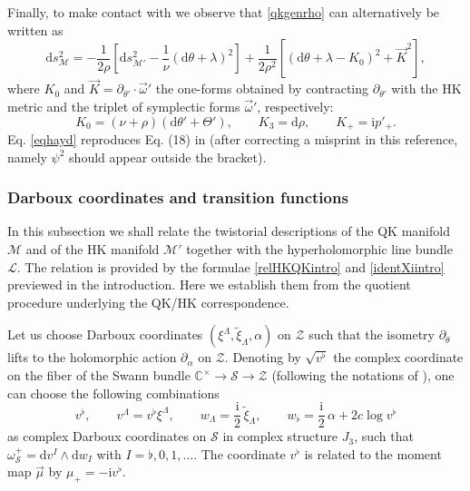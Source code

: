 \documentclass[12pt,reqno]{article}
\numberwithin{equation}{section}
\newcommand{\be}{\begin{equation}}
\newcommand{\ee}{\end{equation}}
\def\({\left(}
\def\){\right)}
\def\vf{v^{\flat}}
\newcommand{\de}{\mathrm{d}}
\newcommand{\I}{\mathrm{i}}
\newcommand{\cS}{\mathcal{S}}
\newcommand{\cM}{\mathcal{M}}
\newcommand{\cZ}{\mathcal{Z}}
\newcommand{\IC}{\mathbb{C}}
\newcommand{\lb}{\mathscr{L}}
\def\pa{\partial}
\newcommand{\txi}{\tilde\xi}
\def\sigp{{\theta}}
\def\phip{{\theta'}}
\def\hcon{p'_+}
\def\pTheta{\Theta'}
\def\pcM{\cM'}
\def\pomega{\omega'}
\def\cfff{\nu} %
\def\conhyper{\lambda}
\numberwithin{equation}{section}
\begin{document}
Finally, to make contact with  \cite{1143.53043}
we observe that \eqref{qkgenrho} can alternatively be written as
\be
\label{eqhayd}
\de s^2_{\cM} =-\frac{1}{2\rho}\left[ \de s^2_{\pcM} - \frac1{\cfff}
\left(\de\sigp+ \conhyper \right)^2 \right]
+\frac{1}{2\rho^2}\left[ \left( \de\sigp+\conhyper -K_0\right)^2
+ \vec K^2 \right],
\ee
where $K_0$ and $\vec K=\pa_{\phip}\cdot \vec\pomega$ the one-forms
obtained by contracting  $\pa_{\phip}$ with the HK metric and the triplet
of symplectic forms $\vec\pomega$, respectively:
\be
K_0=(\cfff+\rho)  \( \de\phip+\pTheta\) ,
\qquad
K_3=\de\rho,
\qquad
K_+=\I \hcon .
\ee
Eq. \eqref{eqhayd} reproduces Eq. (18) in \cite{1143.53043} (after correcting
a misprint in this reference, namely $\psi^2$
should appear outside the bracket).


\subsubsection{Darboux coordinates and transition functions}
\label{subsubsec-darboux}

In this subsection we shall relate the twistorial descriptions of the QK manifold $\cM$ and
of  the HK manifold $\pcM$ together with the hyperholomorphic line bundle $\lb$.
The relation is provided by the formulae  \eqref{relHKQKintro} and
\eqref{identXiintro} previewed in the introduction. Here we establish them from
the quotient procedure underlying the QK/HK correspondence.

Let us choose Darboux coordinates $(\xi^\Lambda,\txi_\Lambda,\alpha)$ on $\cZ$
such that the isometry $\pa_\sigp$ lifts to the holomorphic action $\pa_{\alpha}$ on $\cZ$.
Denoting by  $\sqrt{\vf}$ the complex coordinate on the fiber of the Swann
bundle $\IC^\times\to\cS\to\cZ$ (following the notations
of \cite{Neitzke:2007ke,Alexandrov:2008nk}), one can choose the following combinations
\be
v^\flat,
\qquad
v^\Lambda=v^\flat\xi^\Lambda,
\qquad
w_\Lambda=\frac{\I}{2}\,\txi_\Lambda,
\qquad
w_\flat=\frac{\I}{2}\,\alpha+2c\log\vf
\label{holcoorS}
\ee
as complex Darboux coordinates on $\cS$
in complex structure $J_3$,
such that  $\omega_\cS^+=\de v^I\wedge\de w_I$ with
$I=\flat,0,1,\dots$.
The coordinate $\vf$ is related to the moment map $\vec\mu$ by $\mu_+=-\I\vf$.
\end{document}

